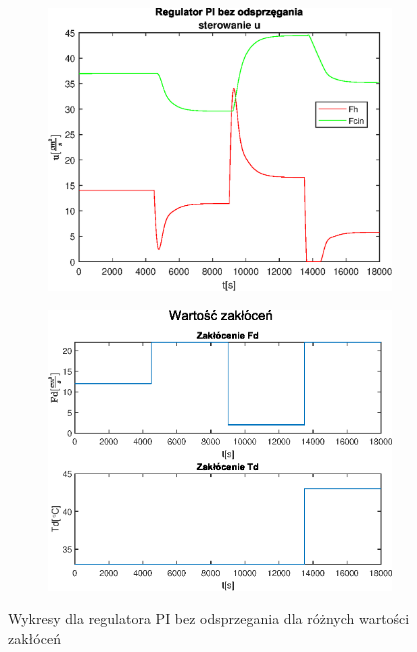 \begin{figure}[h!]
   \begin{subfigure}[b]{0.4\textwidth}
      \includegraphics[width=1\linewidth]{img/PI/noDecoupler/disturbance/PINoDecouplerControl2DisttrueLinfalse.eps}
      \caption{}
      \label{fig:fig:PIDecoupler2DisttrueLinfalse3}
   \end{subfigure}
       
   \begin{subfigure}[b]{0.4\textwidth}
      \includegraphics[width=1\linewidth]{img/PI/noDecoupler/disturbance/PIDecouplerDisturbance2DisttrueLinfalse.eps}
      \caption{}
      \label{fig:fig:PIDecoupler2DisttrueLinfalse4}
   \end{subfigure}
       
   \caption{Wykresy dla regulatora PI bez odsprzegania dla różnych wartości zakłóceń}
   \label{fig:PIDecoupler2DisttrueLinfalse}
\end{figure}
           

